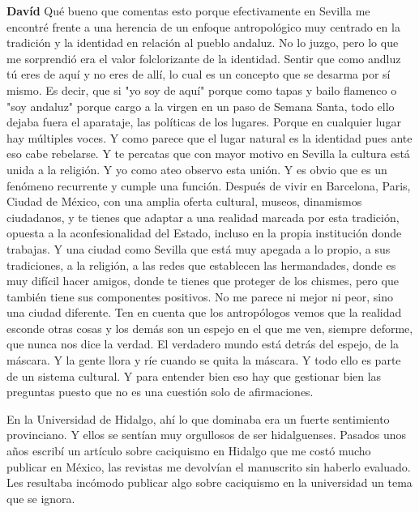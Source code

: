 \documentclass[
  spanish,
  11pt,
  a4paper,
]{scrbook}
\newenvironment{transcripcion}{
    \begin{list}{}{
        \setlength{\leftmargin}{1.5em}  %
        \setlength{\rightmargin}{0em}
        \setlength{\itemsep}{0.2em}     %
        \setlength{\parsep}{0.0em}
        \setlength{\listparindent}{0pt}
    }
}{
    \end{list}
}
\newcommand{\personaje}[1]{\textbf{#1}\quad}
\begin{document}
\begin{transcripcion}
\item \personaje{Davíd} Qué bueno que comentas esto porque efectivamente en Sevilla me encontré frente a una herencia de un enfoque antropológico muy centrado en la tradición y la identidad en relación al pueblo andaluz. No lo juzgo, pero lo que me sorprendió era el valor folclorizante de la identidad. Sentir que como andluz tú eres de aquí y no eres de allí, lo cual es un concepto que se desarma por sí mismo. Es decir, que si "yo soy de aquí" porque como tapas y bailo flamenco o "soy andaluz" porque cargo a la virgen en un paso de Semana Santa, todo ello dejaba fuera el aparataje, las políticas de los lugares. Porque en cualquier lugar hay múltiples voces. Y como parece que el lugar natural es la identidad pues ante eso cabe rebelarse. Y te percatas que con mayor motivo en Sevilla la cultura está unida a la religión. Y yo como ateo observo esta unión. Y es obvio que es un fenómeno recurrente y cumple una función. Después de vivir en Barcelona, Paris, Ciudad de México, con una amplia oferta cultural, museos, dinamismos ciudadanos, y te tienes que adaptar a una realidad marcada por esta tradición, opuesta a la aconfesionalidad del Estado, incluso en la propia institución donde trabajas. Y una ciudad como Sevilla que está muy apegada a lo propio, a sus tradiciones, a la religión, a las redes que establecen las hermandades, donde es muy difícil hacer amigos, donde te tienes que proteger de los chismes, pero que también tiene sus componentes positivos. No me parece ni mejor ni peor, sino una ciudad diferente. Ten en cuenta que los antropólogos vemos que la realidad esconde otras cosas y los demás son un espejo en el que me ven, siempre deforme, que nunca nos dice la verdad. El verdadero mundo está detrás del espejo, de la máscara. Y la gente llora y ríe cuando se quita la máscara. Y todo ello es parte de un sistema cultural. Y para entender bien eso hay que gestionar bien las preguntas puesto que no es una cuestión solo de afirmaciones.

En la Universidad de Hidalgo, ahí lo que dominaba era un fuerte sentimiento provinciano. Y ellos se sentían muy orgullosos de ser hidalguenses. Pasados unos años escribí un artículo sobre caciquismo en Hidalgo que me costó mucho publicar en México, las revistas me devolvían el manuscrito sin haberlo evaluado. Les resultaba incómodo publicar algo sobre caciquismo en la universidad un tema que se ignora.


\end{transcripcion}
\end{document}

